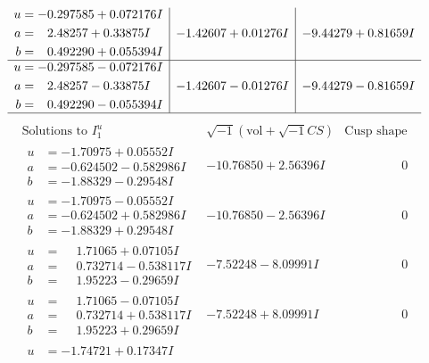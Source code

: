 \documentclass[1p]{elsarticle_modified}
\theoremstyle{definition}
\newcommand{\I}{\sqrt{-1}}
\begin{document}
$$\begin{array}{c|c|c}
\begin{aligned}
u &= -0.297585 + 0.072176 I \\
a &= \phantom{-}2.48257 + 0.33875 I \\
b &= \phantom{-}0.492290 + 0.055394 I\end{aligned}
 & -1.42607 + 0.01276 I & -9.44279 + 0.81659 I \\ \hline\begin{aligned}
u &= -0.297585 - 0.072176 I \\
a &= \phantom{-}2.48257 - 0.33875 I \\
b &= \phantom{-}0.492290 - 0.055394 I\end{aligned}
 & -1.42607 - 0.01276 I & -9.44279 - 0.81659 I\\
 \hline 
 \end{array}$$\newpage$$\begin{array}{c|c|c}  
\text{Solutions to }I^u_{1}& \I (\text{vol} + \sqrt{-1}CS) & \text{Cusp shape}\\
 \hline 
\begin{aligned}
u &= -1.70975 + 0.05552 I \\
a &= -0.624502 - 0.582986 I \\
b &= -1.88329 - 0.29548 I\end{aligned}
 & -10.76850 + 2.56396 I & \phantom{-0.000000 } 0 \\ \hline\begin{aligned}
u &= -1.70975 - 0.05552 I \\
a &= -0.624502 + 0.582986 I \\
b &= -1.88329 + 0.29548 I\end{aligned}
 & -10.76850 - 2.56396 I & \phantom{-0.000000 } 0 \\ \hline\begin{aligned}
u &= \phantom{-}1.71065 + 0.07105 I \\
a &= \phantom{-}0.732714 - 0.538117 I \\
b &= \phantom{-}1.95223 - 0.29659 I\end{aligned}
 & -7.52248 - 8.09991 I & \phantom{-0.000000 } 0 \\ \hline\begin{aligned}
u &= \phantom{-}1.71065 - 0.07105 I \\
a &= \phantom{-}0.732714 + 0.538117 I \\
b &= \phantom{-}1.95223 + 0.29659 I\end{aligned}
 & -7.52248 + 8.09991 I & \phantom{-0.000000 } 0 \\ \hline\begin{aligned}
u &= -1.74721 + 0.17347 I \\

\end{aligned}
\end{array}$$
\end{document}
